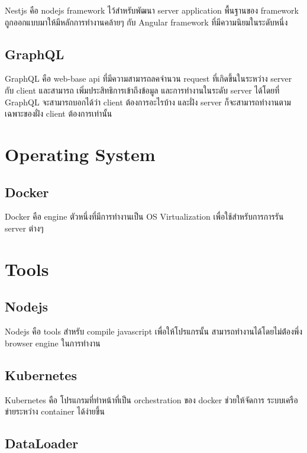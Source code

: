 \enskip Nestjs \cite{nestjs} คือ nodejs \cite{nodejs} framework \cite{framework} ไว้สำหรับพัฒนา server application \cite {serverapplication} พื้นฐานของ framework ถูกออกแบบมาให้มีหลักการทำงานคล้ายๆ กับ Angular framework \cite{angular} ที่มีความนิยมในระดับหนึ่ง

\subsection{GraphQL}

\enskip GraphQL \cite{graphql} คือ web-base api \cite{webapi} ที่มีความสามารถลคจำนวน request ที่เกิดขึ้นในระหว่าง server กับ client และสามารถ เพิ่มประสิทธิการเข้าถึงข้อมูล และการทำงานในระดับ server ได้โดยที่ GraphQL จะสามารถบอกได้ว่า client ต้องการอะไรบ้าง และฝั่ง server ก็จะสามารถทำงานตามเฉพาะของฝั่ง client ต้องการเท่านั้น

\section{Operating System}

\subsection{Docker}

\enskip Docker \cite{docker} คือ engine ตัวหนึ่งที่มีการทำงานเป็น OS Virtualization \cite {osvirtual} เพื่อใช้สำหรับการการรัน server ต่างๆ

\section{Tools}

\subsection{Nodejs}

\enskip Nodejs \cite{nodejs} คือ tools สำหรับ compile javascript เพื่อให้โปรแกรนั้น สามารถทำงานได้โดยไม่ต้่องพึ่ง browser engine ในการทำงาน

\subsection{Kubernetes}

\enskip Kubernetes \cite{kubernetes} คือ โปรแกรมที่ทำหน้าที่เป็น orchestration \cite  {orchestration} ของ docker ช่วยให้จัดการ ระบบเครือข่ายระหว่าง container ได้ง่ายขึ้น

\subsection{DataLoader}

